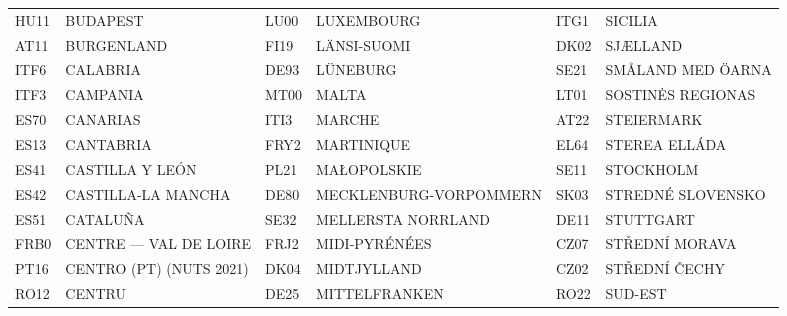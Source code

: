 \documentclass[a4paper,11pt,oneside]{article}
\begin{document}
\begin{table}
{\begin{tabular}{llllll}
HU11                & BUDAPEST                    & LU00                & LUXEMBOURG                 & ITG1                & SICILIA                                                     \\
AT11                & BURGENLAND                  & FI19                & LÄNSI-SUOMI                & DK02                & SJÆLLAND                                                    \\
ITF6                & CALABRIA                    & DE93                & LÜNEBURG                   & SE21                & SMÅLAND MED ÖARNA                                           \\
ITF3                & CAMPANIA                    & MT00                & MALTA                      & LT01                & SOSTINĖS REGIONAS                                           \\
ES70                & CANARIAS                    & ITI3                & MARCHE                     & AT22                & STEIERMARK                                                  \\
ES13                & CANTABRIA                   & FRY2                & MARTINIQUE                 & EL64                & STEREA ELLÁDA                                               \\
ES41                & CASTILLA Y LEÓN             & PL21                & MAŁOPOLSKIE                & SE11                & STOCKHOLM                                                   \\
ES42                & CASTILLA-LA MANCHA          & DE80                & MECKLENBURG-VORPOMMERN     & SK03                & STREDNÉ SLOVENSKO                                           \\
ES51                & CATALUÑA                    & SE32                & MELLERSTA NORRLAND         & DE11                & STUTTGART                                                   \\
FRB0                & CENTRE — VAL DE LOIRE       & FRJ2                & MIDI-PYRÉNÉES              & CZ07                & STŘEDNÍ MORAVA                                              \\
PT16                & CENTRO (PT) (NUTS 2021)     & DK04                & MIDTJYLLAND                & CZ02                & STŘEDNÍ ČECHY                                               \\
RO12                & CENTRU                      & DE25                & MITTELFRANKEN              & RO22                & SUD-EST                                                     \\

\end{tabular}}
\end{table}
\end{document}
